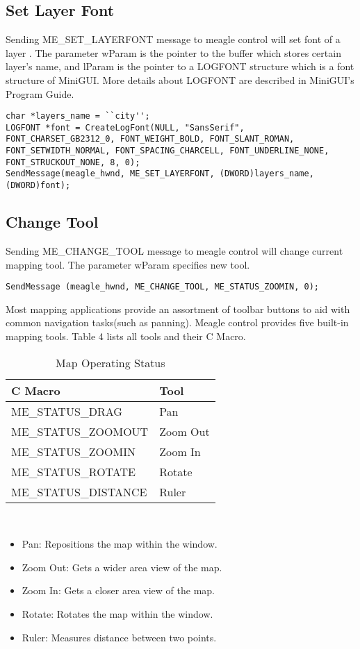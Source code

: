 \documentclass[a4paper]{article}
\begin{document}
\subsection{Set Layer Font}
Sending ME\_SET\_LAYERFONT message to meagle control will set font of a layer . The parameter wParam is the pointer to the buffer which stores certain layer's name, and lParam is the pointer to a LOGFONT structure which is a font structure of MiniGUI. More details about LOGFONT are described in  MiniGUI's Program Guide.
\begin{lstlisting}
char *layers_name = ``city'';
LOGFONT *font = CreateLogFont(NULL, "SansSerif", FONT_CHARSET_GB2312_0, FONT_WEIGHT_BOLD, FONT_SLANT_ROMAN, FONT_SETWIDTH_NORMAL, FONT_SPACING_CHARCELL, FONT_UNDERLINE_NONE, FONT_STRUCKOUT_NONE, 8, 0);
SendMessage(meagle_hwnd, ME_SET_LAYERFONT, (DWORD)layers_name, (DWORD)font);
\end{lstlisting}

\subsection{Change Tool}
Sending ME\_CHANGE\_TOOL message to meagle control will change current mapping tool. The parameter wParam specifies new tool. 
\begin{lstlisting}
SendMessage (meagle_hwnd, ME_CHANGE_TOOL, ME_STATUS_ZOOMIN, 0);
\end{lstlisting}
Most mapping applications provide an assortment of toolbar buttons to aid with common navigation tasks(such as panning). Meagle control provides five built-in mapping tools. Table 4 lists all tools and their C Macro. 
\begin{table}[h]
\centering
\caption{Map Operating Status}
\begin{tabular}{ll}
\hline
C Macro    & Tool \\ \hline
ME\_STATUS\_DRAG & Pan \\ 
ME\_STATUS\_ZOOMOUT & Zoom Out \\ 
ME\_STATUS\_ZOOMIN & Zoom In \\ 
ME\_STATUS\_ROTATE & Rotate \\ 
ME\_STATUS\_DISTANCE & Ruler \\ \hline
\end{tabular}
\end{table} \\
\begin{itemize}
\item Pan: Repositions the map within the window. 
\item Zoom Out: Gets a wider area view of the map. 
\item Zoom In: Gets a closer area view of the map.
\item Rotate: Rotates the map within the window.  
\item Ruler: Measures distance between two points.
\end{itemize}
\end{document}
